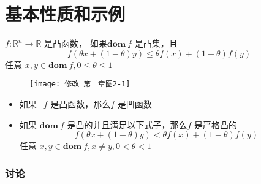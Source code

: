 \documentclass[handout,10pt]{beamer}
\begin{document}
\section{基本性质和示例}
\begin{frame}
\mytitle{\secno \secname}

	$f: \mathbb{R}^{n} \rightarrow \mathbb{R}$ 是凸函数， 如果$\textbf{dom} \ f$ 是凸集，且
    \begin{equation}
	f(\theta x+(1-\theta) y) \leq \theta f(x)+(1-\theta) f(y)
    \end{equation}
任意 $x, y \in \textbf{dom}\  f, 0 \leq \theta \leq 1$
    \begin{figure}[htbp]
    \centering
   \texttt{[image: 修改\_第二章图2-1]}
    \end{figure}
    \begin{itemize}
    	\item 如果$-f$ 是凸函数，那么$f$ 是凹函数 
    	\item 如果 $\textbf{dom} \ f$ 是凸的并且满足以下式子，那么$f$ 是严格凸的
    	\begin{equation}
    		f(\theta x+(1-\theta) y)<\theta f(x)+(1-\theta) f(y)
    	\end{equation}
    	任意 $x, y \in \textbf{dom}\ f, x \neq y, 0<\theta<1$
    \end{itemize}
\end{frame}

\begin{frame}
  \frametitle{讨论}

  \vspace{5ex}
\end{frame}
\end{document}
